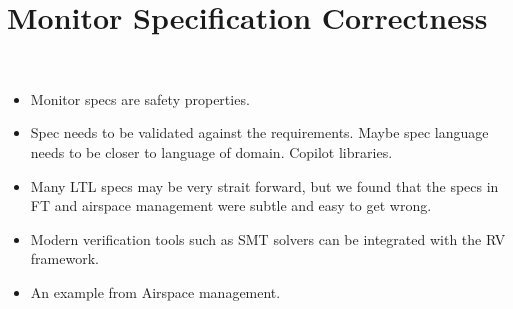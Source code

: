 \section{Monitor Specification Correctness}~\label{sec:verispec}

\noindent{}

\begin{itemize}
\item Monitor specs are safety properties. 
\item Spec needs to be validated against the requirements. Maybe spec
  language needs to be closer to  language of domain.  Copilot
  libraries. 
\item Many LTL specs may be very strait forward, but we found that the
  specs in FT and airspace management were subtle and easy to get
  wrong. 
\item Modern verification tools such as SMT solvers can be integrated
  with the RV framework. 
\item An example from Airspace management. 
\end{itemize} 